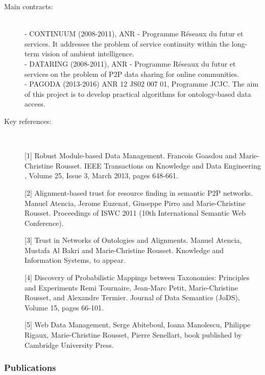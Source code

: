 \begin{description}
\item[Main contracts:] \ \\
- CONTINUUM (2008-2011), ANR - Programme R{\'e}seaux du futur et services.  It addresses the problem of service continuity within the long-term vision of ambient intelligence. \\
- DATARING (2008-2011), ANR - Programme R{\'e}seaux du futur et services on the problem of P2P data sharing for online communities. \\
- PAGODA (2013-2016)  ANR 12 JS02 007 01, Programme JCJC. The aim of this project is to develop practical algorithms for ontology-based data access. 
  
\item[Key references:]~%

[1] Robust Module-based Data Management. Francois Goasdou and Marie-Christine Rousset. IEEE Transactions on Knowledge and Data Engineering , Volume 25, Issue 3, March 2013, pages 648-661. 

[2] Alignment-based trust for resource finding in semantic P2P networks. Manuel Atencia, Jerome Euzenat, Giuseppe Pirro and Marie-Christine Rousset. Proceedings of ISWC 2011 (10th International Semantic Web Conference). 

[3] Trust in Networks of Ontologies and Alignments. Manuel Atencia, Mustafa Al Bakri and Marie-Christine Rousset.  Knowledge and Information Systems, to appear. 

[4] Discovery of Probabilistic Mappings between Taxonomies: Principles and Experiments Remi Tournaire, Jean-Marc Petit, Marie-Christine Rousset, and Alexandre Termier. Journal of Data Semantics (JoDS), Volume 15, pages 66-101. 

[5] Web Data Management, Serge Abiteboul, Ioana Manolescu, Philippe Rigaux, Marie-Christine Rousset, Pierre Senellart, book published by Cambridge University Press. 

\end{description}

\subsubsection{Publications} %

